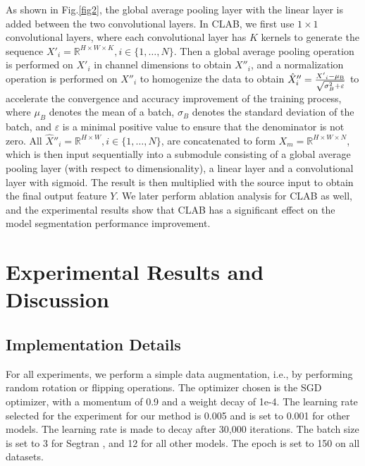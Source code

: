 \documentclass[runningheads]{llncs}
\begin{document}
As shown in Fig.\ref{fig2}, the global average pooling layer with the linear layer is added between the two convolutional layers. In CLAB, we first use $1 \times 1$ convolutional layers, where each convolutional layer has $K$ kernels to generate the sequence ${X'_i} = {\mathbb{R}^{H \times W \times K}},i \in \{ 1, \ldots ,N\} $. Then a global average pooling operation is performed on ${X'_i}$ in channel dimensions to obtain ${X''_i}$, and a normalization operation is performed on ${X''_i}$ to homogenize the data to obtain ${\hat X''_i} = \frac{{{{X'}_i} - {\mu _{\rm B}}}}{{\sqrt {\sigma _B^2 + \varepsilon } }}$ to accelerate the convergence and accuracy improvement of the training process, where ${\mu _B}$ denotes the mean of a batch, ${\sigma _B}$ denotes the standard deviation of the batch, and  $\varepsilon$ is a minimal positive value to ensure that the denominator is not zero. All ${\hat X''_i} = {\mathbb{R}^{H \times W}},i \in \{ 1, \ldots ,N\} $, are concatenated to form ${X_m} = {\mathbb{R}^{H \times W \times N}}$, which is then input sequentially into a submodule consisting of a global average pooling layer (with respect to dimensionality), a linear layer and a convolutional layer with sigmoid. The result is then multiplied with the source input to obtain the final output feature $Y$. We later perform ablation analysis for CLAB as well, and the experimental results show that CLAB has a significant effect on the model segmentation performance improvement.



\section{Experimental Results and Discussion}
\label{sec4}

\subsection{Implementation Details}
\label{sec4.1}
For all experiments, we perform a simple data augmentation, i.e., by performing random rotation or flipping operations. The optimizer chosen is the SGD optimizer, with a momentum of 0.9 and a weight decay of 1e-4. The learning rate selected for the experiment for our method is 0.005 and is set to 0.001 for other models. The learning rate is made to decay after 30,000 iterations. The batch size is set to 3 for Segtran \cite{zheng2021rethinking}, and 12 for all other models. The epoch is set to 150 on all datasets.
\end{document}
